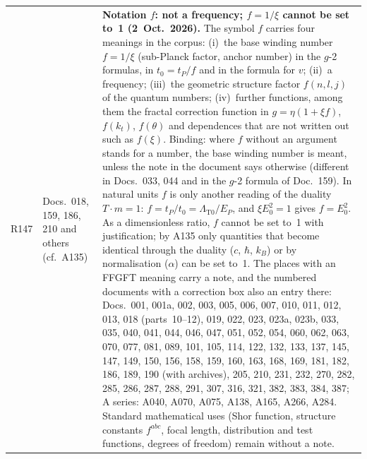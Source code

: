 \begin{longtable}{@{}p{0.9cm}p{3.1cm}p{10.2cm}@{}}
R147 & Docs.~018, 159, 186, 210 and others (cf.\ A135) & \textbf{Notation $f$: not a frequency; $f = 1/\xi$ cannot be set to~1 (2~Oct.~2026).} The symbol $f$ carries four meanings in the corpus: (i)~the base winding number $f = 1/\xi$ (sub-Planck factor, anchor number) in the $g$-2 formulas, in $t_0 = t_P/f$ and in the formula for $v$; (ii)~a frequency; (iii)~the geometric structure factor $f(n,l,j)$ of the quantum numbers; (iv)~further functions, among them the fractal correction function in $g = \eta(1+\xi f)$, $f(k_t)$, $f(\theta)$ and dependences that are not written out such as $f(\xi)$. Binding: where $f$ without an argument stands for a number, the base winding number is meant, unless the note in the document says otherwise (different in Docs.~033, 044 and in the $g$-2 formula of Doc.~159). In natural units $f$ is only another reading of the duality $T\cdot m = 1$: $f = t_P/t_0 = \Lambda_{\text{T0}}/E_P$, and $\xi E_0^2 = 1$ gives $f = E_0^2$. As a dimensionless ratio, $f$ cannot be set to~1 with justification; by A135 only quantities that become identical through the duality ($c$, $\hbar$, $k_B$) or by normalisation ($\alpha$) can be set to~1. The places with an FFGFT meaning carry a note, and the numbered documents with a correction box also an entry there: Docs.~001, 001a, 002, 003, 005, 006, 007, 010, 011, 012, 013, 018 (parts~10--12), 019, 022, 023, 023a, 023b, 033, 035, 040, 041, 044, 046, 047, 051, 052, 054, 060, 062, 063, 070, 077, 081, 089, 101, 105, 114, 122, 132, 133, 137, 145, 147, 149, 150, 156, 158, 159, 160, 163, 168, 169, 181, 182, 186, 189, 190 (with archives), 205, 210, 231, 232, 270, 282, 285, 286, 287, 288, 291, 307, 316, 321, 382, 383, 384, 387; A series: A040, A070, A075, A138, A165, A266, A284. Standard mathematical uses (Shor function, structure constants $f^{abc}$, focal length, distribution and test functions, degrees of freedom) remain without a note. \\

\end{longtable}

